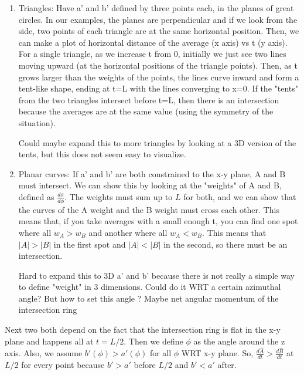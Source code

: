 \documentclass[12pt]{article}
\begin{document}
\begin{enumerate}
\item Triangles: Have a' and b' defined by three points each, in the planes of great circles. In our examples, the planes are perpendicular and if we look from the side, two points of each triangle are at the same horizontal position. Then, we can make a plot of horizontal distance of the average (x axis) vs t (y axis). For a single triangle, as we increase t from 0, initially we just see two lines moving upward (at the horizontal positions of the triangle points). Then, as t grows larger than the weights of the points, the lines curve inward and form a tent-like shape, ending at t=L with the lines converging to x=0. If the "tents" from the two triangles intersect before t=L, then there is an intersection because the averages are at the same value (using the symmetry of the situation).

Could maybe expand this to more triangles by looking at a 3D version of the tents, but this does not seem easy to visualize.

\item Planar curves: If a' and b' are both constrained to the x-y plane, A and B must intersect. We can show this by looking at the "weights" of A and B, defined as $\frac{d\sigma}{d\phi}$. The weights must sum up to $L$ for both, and we can show that the curves of the A weight and the B weight must cross each other. This means that, if you take averages with a small enough t, you can find one spot where all $w_A > w_B$ and another where all $w_A < w_B$. This means that $|A| > |B|$ in the first spot and $|A| < |B|$ in the second, so there must be an intersection.

Hard to expand this to 3D a' and b' because there is not really a simple way to define "weight" in 3 dimensions. Could do it WRT a certain azimuthal angle? But how to set this angle ? Maybe net angular momentum of the intersection ring
\end{enumerate}

Next two both depend on the fact that the intersection ring is flat in the x-y plane and happens all at $t=L/2$. Then we define $\phi$ as the angle around the z axis. Also, we assume $b'(\phi)>a'(\phi)$ for all $\phi$ WRT x-y plane. So, $\frac{d\hat{A}}{dt} > \frac{d\hat{B}}{dt}$ at $L/2$ for every point because $b' > a'$ before $L/2$ and $b' < a'$ after.
\end{document}
